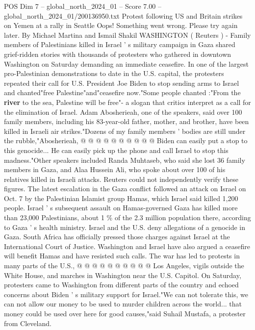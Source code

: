 \begin{textsample}{POS Dim 7 – global\_north\_2024\_01 – Score 7.00 – global\_north\_2024\_01/200136950.txt}  \label{ex:f7_pos_196}
Protest following US and Britain strikes on Yemen at a rally in Seattle Oops!
Something went wrong.
Please try again later.
By Michael Martina and Ismail Shakil WASHINGTON ( Reuters ) - Family members of Palestinians killed in Israel ' s military campaign in Gaza shared grief-ridden stories with thousands of protesters who gathered in downtown Washington on Saturday demanding an immediate ceasefire.
In one of the largest pro-Palestinian demonstrations to date in the U.S. capital, the protesters repeated their call for U.S.
President Joe Biden to stop sending arms to Israel and chanted"free Palestine"and"ceasefire now."Some people chanted :"From the \textbf{river} to the sea, Palestine will be free"- a slogan that critics interpret as a call for the elimination of Israel.
Adam Abosherieah, one of the speakers, said over 100 family members, including his 83-year-old father, mother, and brother, have been killed in Israeli air strikes."Dozens of my family members ' bodies are still under the rubble,"Abosherieah, @ @ @ @ @ @ @ @ @ @ Biden can easily put a stop to this genocide...
He can easily pick up the phone and call Israel to stop this madness."Other speakers included Randa Muhtaseb, who said she lost 36 family members in Gaza, and Alaa Hussein Ali, who spoke about over 100 of his relatives killed in Israeli attacks.
Reuters could not independently verify these figures.
The latest escalation in the Gaza conflict followed an attack on Israel on Oct. 7 by the Palestinian Islamist group Hamas, which Israel said killed 1,200 people.
Israel ' s subsequent assault on Hamas-governed Gaza has killed more than 23,000 Palestinians, about 1 \% of the 2.3 million population there, according to Gaza ' s health ministry.
Israel and the U.S. deny allegations of a genocide in Gaza.
South Africa has officially pressed those charges against Israel at the International Court of Justice.
Washington and Israel have also argued a ceasefire will benefit Hamas and have resisted such calls.
The war has led to protests in many parts of the U.S., @ @ @ @ @ @ @ @ @ @ Los Angeles, vigils outside the White House, and marches in Washington near the U.S.
Capitol.
On Saturday, protesters came to Washington from different parts of the country and echoed concerns about Biden ' s military support for Israel."We can not tolerate this, we can not allow our money to be used to murder children across the world... that money could be used over here for good causes,"said Suhail Mustafa, a protester from Cleveland.

\end{textsample}
